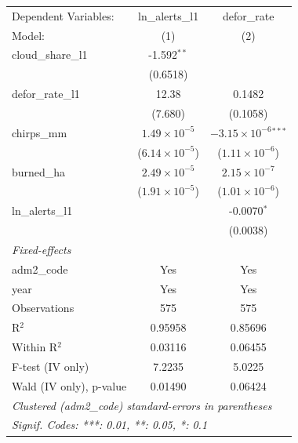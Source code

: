 \begingroup
\centering
\begin{tabular}{lcc}
   \tabularnewline \midrule \midrule
   Dependent Variables:    & ln\_alerts\_l1          & defor\_rate\\   
   Model:                  & (1)                     & (2)\\  
   \midrule
   cloud\_share\_l1        & -1.592$^{**}$           &   \\   
                           & (0.6518)                &   \\   
   defor\_rate\_l1         & 12.38                   & 0.1482\\   
                           & (7.680)                 & (0.1058)\\   
   chirps\_mm              & $1.49\times 10^{-5}$    & $-3.15\times 10^{-6}$$^{***}$\\    
                           & ($6.14\times 10^{-5}$)  & ($1.11\times 10^{-6}$)\\    
   burned\_ha              & $2.49\times 10^{-5}$    & $2.15\times 10^{-7}$\\    
                           & ($1.91\times 10^{-5}$)  & ($1.01\times 10^{-6}$)\\    
   ln\_alerts\_l1          &                         & -0.0070$^{*}$\\   
                           &                         & (0.0038)\\   
   \midrule
   \emph{Fixed-effects}\\
   adm2\_code              & Yes                     & Yes\\  
   year                    & Yes                     & Yes\\  
   \midrule
   Observations            & 575                     & 575\\  
   R$^2$                   & 0.95958                 & 0.85696\\  
   Within R$^2$            & 0.03116                 & 0.06455\\  
   F-test (IV only)        & 7.2235                  & 5.0225\\  
   Wald (IV only), p-value & 0.01490                 & 0.06424\\  
   \midrule \midrule
   \multicolumn{3}{l}{\emph{Clustered (adm2\_code) standard-errors in parentheses}}\\
   \multicolumn{3}{l}{\emph{Signif. Codes: ***: 0.01, **: 0.05, *: 0.1}}\\
\end{tabular}
\par\endgroup
